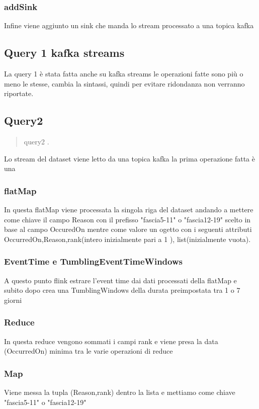 \documentclass[acmsmall]{acmart}
\begin{document}
\subsubsection{addSink}
Infine viene aggiunto un sink che manda lo stream processato a una topica kafka

\subsection{Query 1 kafka streams}
La query 1 è stata fatta anche su kafka streams le operazioni fatte sono più o meno le stesse, cambia la sintassi, quindi per evitare ridondanza non verranno riportate.


\subsection{Query2}
\begin{quote}
query2 .\end{quote}

Lo stream del dataset viene letto da una topica kafka la prima operazione fatta 
è una 

\subsubsection{flatMap}
In questa flatMap viene processata la singola riga del dataset andando a mettere come chiave il campo Reason con il prefisso "fascia5-11" o "fascia12-19" scelto in base al campo OccuredOn mentre come valore un ogetto con i seguenti attributi
OccurredOn,Reason,rank(intero inizialmente pari a 1 ), list(inizialmente vuota).


\subsubsection{EventTime e TumblingEventTimeWindows}
A questo punto flink estrare l'event time dai dati processati della flatMap e 
subito dopo crea una TumblingWindows della durata preimpostata tra 1 o 7 giorni


\subsubsection{Reduce}
In questa reduce vengono sommati i campi rank e viene presa la data (OccurredOn) minima tra le varie operazioni di reduce 


\subsubsection{Map}
Viene messa la tupla (Reason,rank) dentro la lista e mettiamo come chiave "fascia5-11" o "fascia12-19"
\end{document}
